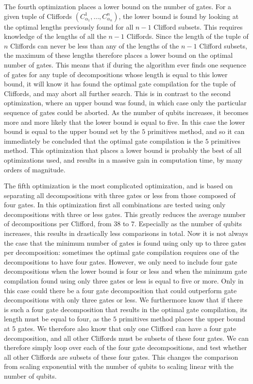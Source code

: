       The fourth optimization places a lower bound on the number of gates. For a given tuple of Cliffords $\left(C_{\alpha_1}^1, \dots, C_{\alpha_n}^n\right)$, the lower bound is found by looking at the optimal lengths previously found for all $n-1$ Clifford subsets. This requires knowledge of the lengths of all the $n-1$ Cliffords. Since the length of the tuple of $n$ Cliffords can never be less than any of the lengths of the $n-1$ Clifford subsets, the maximum of these lengths therefore places a lower bound on the optimal number of gates. This means that if during the algorithm ever finds one sequence of gates for any tuple of decompositions whose length is equal to this lower bound, it will know it has found the optimal gate compilation for the tuple of Cliffords, and may abort all further search. This is in contrast to the second optimization, where an upper bound was found, in which case only the particular sequence of gates could be aborted. As the number of qubits increases, it becomes more and more likely that the lower bound is equal to five. In this case the lower bound is equal to the upper bound set by the $5$ primitives method, and so it can immediately be concluded that the optimal gate compilation is the $5$ primitives method. This optimization that places a lower bound is probably the best of all optimizations used, and results in a massive gain in computation time, by many orders of magnitude.

      The fifth optimization is the most complicated optimization, and is based on separating all decompositions with three gates or less from those composed of four gates. In this optimization first all combinations are tested using only decompositions with three or less gates. This greatly reduces the average number of decompositions per Clifford, from $38$ to $7$. Especially as the number of qubits increases, this results in drastically less comparisons in total. Now it is not always the case that the minimum number of gates is found using only up to three gates per decomposition: sometimes the optimal gate compilation requires one of the decompositions to have four gates. However, we only need to include four gate decompositions when the lower bound is four or less and when the minimum gate compilation found using only three gates or less is equal to five or more. Only in this case could there be a four gate decomposition that could outperform gate decompositions with only three gates or less. We furthermore know that if there is such a four gate decomposition that results in the optimal gate compilation, its length must be equal to four, as the $5$ primitives method places the upper bound at $5$ gates. We therefore also know that only one Clifford can have a four gate decomposition, and all other Cliffords must be subsets of these four gates. We can therefore simply loop over each of the four gate decompositions, and test whether all other Cliffords are subsets of these four gates. This changes the comparison from scaling exponential with the number of qubits to scaling linear with the number of qubits.


